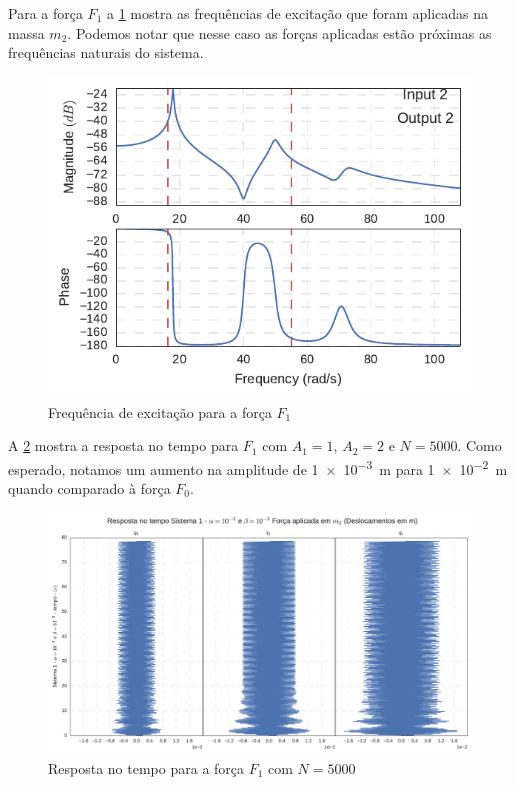 Para a força $F_1$ a \cref{fig:FRF_i2_o2_freq_1_2} mostra as frequências de excitação que foram aplicadas na massa $m_2$. Podemos notar que nesse caso as forças aplicadas estão próximas as frequências naturais do sistema.

\begin{figure}
	\centering
	\includegraphics[scale=1]{IMGS/FRF_i2_o2_freq_1_2.pdf}
	\caption{Frequência de excitação para a força $F_1$}
	\label{fig:FRF_i2_o2_freq_1_2}
\end{figure}

A \cref{fig:F1_5000_tempo} mostra a resposta no tempo para $F_1$ com $ A_1 = 1 $, $ A_2 = 2  $ e $ N=5000 $. Como esperado, notamos um aumento na amplitude de \SI{1e-3}{\m} para \SI{1e-2}{\m} quando comparado à força $ F_0 $.

\begin{figure}
	\centering
	\includegraphics[scale=0.6]{IMGS/F1_5000_tempo.pdf}
	\caption{Resposta no tempo para a força $F_1$ com $N=5000$}
	\label{fig:F1_5000_tempo}
\end{figure}

